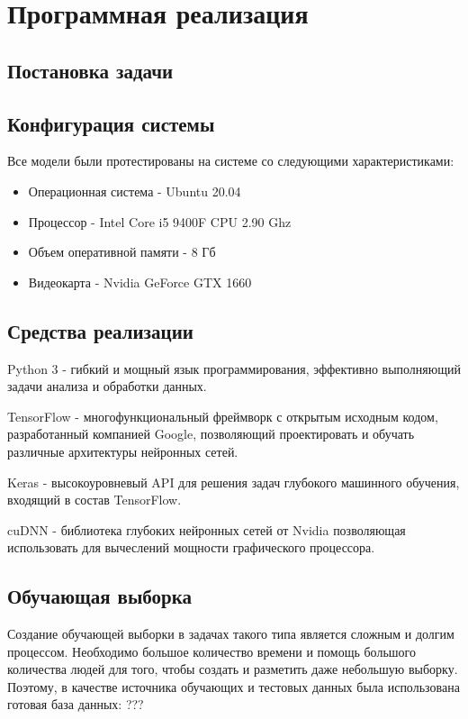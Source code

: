 \section{Программная реализация}

\subsection{Постановка задачи}

\subsection{Конфигурация системы}
Все модели были протестированы на системе со следующими характеристиками:
\begin{itemize}
  \item Операционная система - Ubuntu 20.04
  \item Процессор - Intel Core i5 9400F CPU 2.90 Ghz
  \item Объем оперативной памяти - 8 Гб
  \item Видеокарта - Nvidia GeForce GTX 1660
\end{itemize}

\subsection{Средства реализации}
Python 3 - гибкий и мощный язык программирования, эффективно выполняющий задачи анализа и обработки данных. 

TensorFlow - многофункциональный фреймворк с открытым исходным кодом, разработанный компанией Google, позволяющий проектировать и обучать различные архитектуры нейронных сетей.

Keras - высокоуровневый API для решения задач глубокого машинного обучения, входящий в состав TensorFlow.

cuDNN - библиотека глубоких нейронных сетей от Nvidia позволяющая использовать для вычеслений мощности графического процессора. 
\subsection{Обучающая выборка}
Создание обучающей выборки в задачах такого типа является сложным
и долгим процессом. Необходимо большое количество времени и помощь
большого количества людей для того, чтобы создать и разметить
даже небольшую выборку.
Поэтому, в качестве источника обучающих и тестовых данных была использована готовая база данных: ??? 

